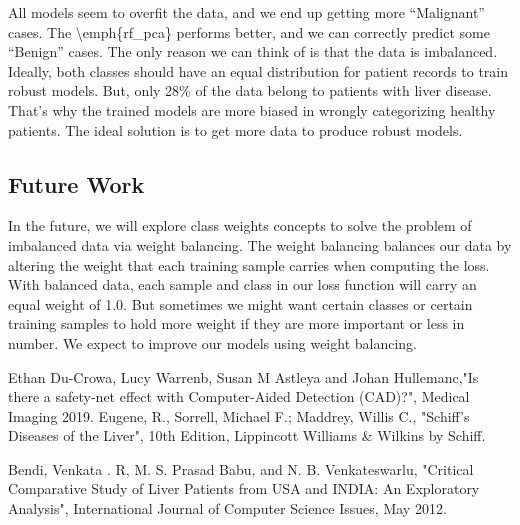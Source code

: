 \documentclass[]{article}
\begin{document}
All models seem to overfit the data, and we end up getting more
``Malignant'' cases. The \textbackslash emph\{rf\_pca\} performs better,
and we can correctly predict some ``Benign'' cases. The only reason we
can think of is that the data is imbalanced. Ideally, both classes
should have an equal distribution for patient records to train robust
models. But, only 28\% of the data belong to patients with liver
disease. That's why the trained models are more biased in wrongly
categorizing healthy patients. The ideal solution is to get more data to
produce robust models.

\subsection{Future Work}
\label{sec:futurework}

In the future, we will explore class weights concepts to solve the
problem of imbalanced data via weight balancing. The weight balancing
balances our data by altering the weight that each training sample
carries when computing the loss. With balanced data, each sample and
class in our loss function will carry an equal weight of 1.0. But
sometimes we might want certain classes or certain training samples to
hold more weight if they are more important or less in number. We expect
to improve our models using weight balancing.

\begin{thebibliography}{9}
Ethan Du-Crowa, Lucy Warrenb, Susan M Astleya and Johan Hullemanc,"Is there a safety-net effect with Computer-Aided Detection (CAD)?", Medical Imaging 2019.
Eugene, R., Sorrell, Michael F.; Maddrey, Willis C., "Schiff's Diseases of the Liver", 10th Edition, Lippincott Williams \& Wilkins by Schiff.

Bendi,  Venkata . R, M. S. Prasad Babu, and N. B. Venkateswarlu, "Critical Comparative Study of Liver Patients from USA and INDIA: An Exploratory Analysis", International Journal of Computer Science Issues, May 2012.


\end{thebibliography}
\end{document}
